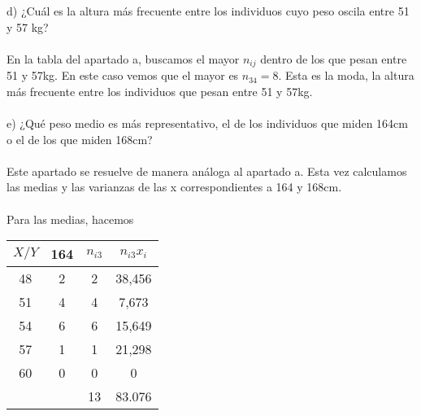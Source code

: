 \documentclass{article}
\begin{document}
    d) ¿Cuál es la altura más frecuente  entre los individuos cuyo peso oscila entre 51 y 57 kg? \\ \\
    En la tabla del apartado a, buscamos el mayor $n_{ij}$ dentro de los que pesan entre 51 y 57kg. En este caso vemos que el mayor es $n_{34}=8$. Esta es la moda, la altura más frecuente entre los individuos que pesan entre 51 y 57kg. \\ \\
    
    e) ¿Qué peso medio es más representativo, el de los individuos que miden 164cm o el de los que miden 168cm? \\ \\
    Este apartado se resuelve de manera análoga al apartado a. Esta vez calculamos las medias y las varianzas de las x correspondientes a 164 y 168cm. \\ \\
    Para las medias, hacemos 
    \begin{center}
    \begin{tabular}{| c | c | c | c |}
        \hline
        $X / Y$ & 164 & $n_{i3}$ & $n_{i3}x_i$\\ \hline
        48 & 2 & 2 & 38,456 \\
        51 & 4 & 4 & 7,673 \\
        54 & 6 & 6 & 15,649 \\
        57 & 1 & 1 & 21,298 \\
        60 & 0 & 0 & 0 \\
        & & 13 & 83.076 \\
        \hline
    \end{tabular} \\
    \end{center}
    
\end{document}
